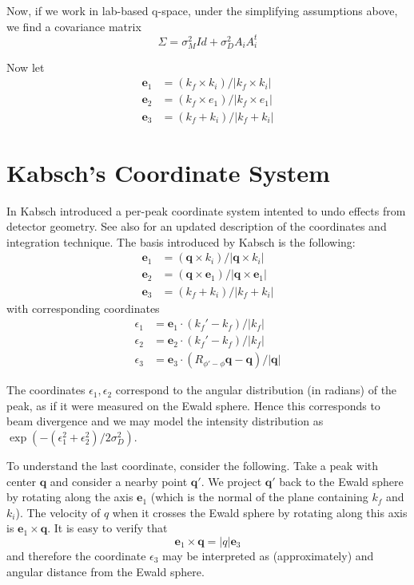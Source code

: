 \documentclass{report}
\newcommand{\be}{\mathbf{e}}
\newcommand{\bq}{\mathbf{q}}
\begin{document}
Now, if we work in lab-based q-space, under the simplifying assumptions above, we find a covariance matrix
\[ \Sigma = \sigma_M^2 Id + \sigma_D^2 A_i A_i^t \]

Now let
\begin{align*}
  \be_1 &= (k_f \times k_i) / |k_f \times k_i| \\
  \be_2 &= (k_f \times e_1) / |k_f \times e_1| \\
  \be_3 &= (k_f + k_i) / |k_f + k_i|
\end{align*}

\section{Kabsch's Coordinate System}

In \cite{kabsch-1988} Kabsch introduced a per-peak coordinate system intented to undo effects from detector geometry.
See also \cite{kabsch-2010} for an updated description of the coordinates and integration technique.
The basis introduced by Kabsch is the following:
\begin{align*}
  \be_1 &= (\bq \times k_i) / |\bq \times k_i| \\
  \be_2 &= (\bq \times \be_1) / |\bq \times \be_1| \\
  \be_3 &= (k_f + k_i) / |k_f + k_i|
\end{align*}
with corresponding coordinates
\begin{align*}
  \epsilon_1 &= \be_1 \cdot (k_f'-k_f) / |k_f| \\
  \epsilon_2 &= \be_2 \cdot (k_f'-k_f) / |k_f| \\
  \epsilon_3 &= \be_3 \cdot (R_{\phi'-\phi}\bq-\bq) / |\bq|
\end{align*}

The coordinates $\epsilon_1, \epsilon_2$ correspond to the angular distribution (in radians) of the peak, as if it were measured on the Ewald sphere. Hence this corresponds to beam divergence and we may model the intensity distribution as $\exp(-(\epsilon_1^2 + \epsilon_2^2)/2 \sigma_D^2)$.

To understand the last coordinate, consider the following. Take a peak with center $\bq$ and consider a nearby point $\bq'$. We project $\bq'$ back to the Ewald sphere by rotating along the axis $\be_1$ (which is the normal of the plane containing $k_f$ and $k_i$). The velocity of $q$ when it crosses the Ewald sphere by rotating along this axis is $\be_1 \times \bq$. It is easy to verify that
\[ \be_1 \times \bq = |q| \be_3 \]
and therefore the coordinate $\epsilon_3$ may be interpreted as (approximately) and angular distance from the Ewald sphere.
\end{document}
